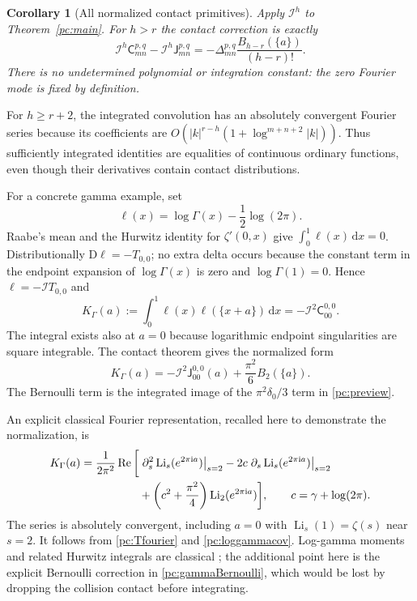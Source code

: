 \documentclass[11pt,a4paper]{article}
\numberwithin{equation}{section}
\newtheorem{corollary}[theorem]{Corollary}
\theoremstyle{definition}
\newcommand{\dd}{\,\mathrm dx}
\newcommand{\ii}{\mathrm i}
\newcommand{\D}{\mathrm D}
\newcommand{\Li}{\operatorname{Li}}
\newcommand{\Rea}{\operatorname{Re}}
\newcommand{\Jf}{\mathsf J}
\newcommand{\Cf}{\mathsf C}
\newcommand{\If}{\mathcal I}
\begin{document}
\begin{corollary}[All normalized contact primitives]\label{pc:primitivecor}
Apply $\If^h$ to Theorem~\ref{pc:main}. For $h>r$ the contact correction is exactly
\begin{equation}\label{pc:bernoulli}
 \If^h\Cf_{mn}^{p,q}-\If^h\Jf_{mn}^{p,q}
 =-\Delta_{mn}^{p,q}\frac{B_{h-r}(\{a\})}{(h-r)!}.
\end{equation}
There is no undetermined polynomial or integration constant: the zero Fourier mode is fixed by definition.
\end{corollary}
For $h\ge r+2$, the integrated convolution has an absolutely convergent Fourier series because its coefficients are
$O(|k|^{r-h}(1+\log^{m+n+2}|k|))$. Thus sufficiently integrated identities are equalities of continuous ordinary functions, even though their derivatives contain contact distributions.

For a concrete gamma example, set
\[
 \ell(x)=\log\Gamma(x)-\frac12\log(2\pi).
\]
Raabe's mean and the Hurwitz identity for $\zeta'(0,x)$ give $\int_0^1\ell(x)\dd=0$. Distributionally $\D\ell=-T_{0,0}$; no extra delta occurs because the constant term in the endpoint expansion of $\log\Gamma(x)$ is zero and $\log\Gamma(1)=0$. Hence $\ell=-\If T_{0,0}$ and
\begin{equation}\label{pc:loggammacov}
 K_\Gamma(a):=\int_0^1\ell(x)\ell(\{x+a\})\dd
 =-\If^2\Cf_{00}^{0,0}.
\end{equation}
The integral exists also at $a=0$ because logarithmic endpoint singularities are square integrable. The contact theorem gives the normalized form
\begin{equation}\label{pc:gammaBernoulli}
 K_\Gamma(a)=-\If^2\Jf_{00}^{0,0}(a)+\frac{\pi^2}{6}B_2(\{a\}).
\end{equation}
The Bernoulli term is the integrated image of the $\pi^2\delta_0/3$ term in \eqref{pc:preview}.

An explicit classical Fourier representation, recalled here to demonstrate the normalization, is
\begin{align}\label{pc:gammaLi}
 K_\Gamma(a)=\frac1{2\pi^2}\Rea\bigg[
 &\left.\partial_s^2\Li_s(e^{2\pi\ii a})\right|_{s=2}
 -2c\left.\partial_s\Li_s(e^{2\pi\ii a})\right|_{s=2}\notag\\
 &+\left(c^2+\frac{\pi^2}{4}\right)\Li_2(e^{2\pi\ii a})\bigg],
 \qquad c=\gamma+\log(2\pi).
\end{align}
The series is absolutely convergent, including $a=0$ with $\Li_s(1)=\zeta(s)$ near $s=2$. It follows from \eqref{pc:Tfourier} and \eqref{pc:loggammacov}. Log-gamma moments and related Hurwitz integrals are classical \cite{pc:EM}; the additional point here is the explicit Bernoulli correction in \eqref{pc:gammaBernoulli}, which would be lost by dropping the collision contact before integrating.
\end{document}
